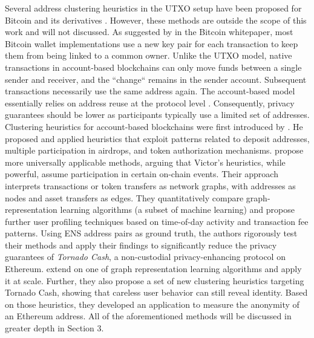 \documentclass[12pt,a4paper,titlepage,oneside,english]{article}
\begin{document}
Several address clustering heuristics in the UTXO setup have been proposed for Bitcoin and its derivatives \citep{Androulaki2013, Meiklejohn2013, Haslhofer2016, jourdan2018, kappos2022}. However, these methods are outside the scope of this work and will not discussed. \newline 
As suggested by \cite{nakamotoBitcoin2008} in the Bitcoin whitepaper, most Bitcoin wallet implementations use a new key pair for each transaction to keep them from being linked to a common owner. Unlike the UTXO model, native transactions in account-based blockchains can only move funds between a single sender and receiver, and the ``change`` remains in the sender account. Subsequent transactions necessarily use the same address again. The account-based model essentially relies on address reuse at the protocol level \citep{Beres2020}. Consequently, privacy guarantees should be lower as participants typically use a limited set of addresses. \newline
Clustering heuristics for account-based blockchains were first introduced by \cite{FV:17}. He proposed and applied heuristics that exploit patterns related to deposit addresses, multiple participation in airdrops, and token authorization mechanisms. \newline
\cite{Beres2020} propose more universally applicable methods, arguing that Victor’s heuristics, while powerful, assume participation in certain on-chain events. Their approach interprets transactions or token transfers as network graphs, with addresses as nodes and asset transfers as edges. They quantitatively compare graph-representation learning algorithms (a subset of machine learning) and propose further user profiling techniques based on time-of-day activity and transaction fee patterns. Using ENS address pairs as ground truth, the authors rigorously test their methods and apply their findings to significantly reduce the privacy guarantees of \textit{Tornado Cash}, a non-custodial privacy-enhancing protocol on Ethereum. \newline
\cite{wu2022tutela} extend on one of \cite{Beres2020} graph representation learning algorithms and apply it at scale. Further, they also propose a set of new clustering heuristics targeting Tornado Cash,  showing that careless user behavior can still reveal identity. Based on those heuristics, they developed an application to measure the anonymity of an Ethereum address. All of the aforementioned methods will be discussed in greater depth in Section 3. \newline
\end{document}
